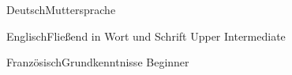 \documentclass[a4paper,8pt]{cv}
\begin{document}
      \vspace{-1.8em}
      \begin{multicols}{2}
        \begin{cvSkillItem}{Deutsch}{Muttersprache}
        \end{cvSkillItem}
        \begin{cvSkillItem}{Englisch}{Fließend in Wort und Schrift}
          Upper Intermediate
        \end{cvSkillItem}
        \begin{cvSkillItem}{Französisch}{Grundkenntnisse}
          Beginner
        \end{cvSkillItem}
      \end{multicols}

      \vspace{-1.8em}
\end{document}
